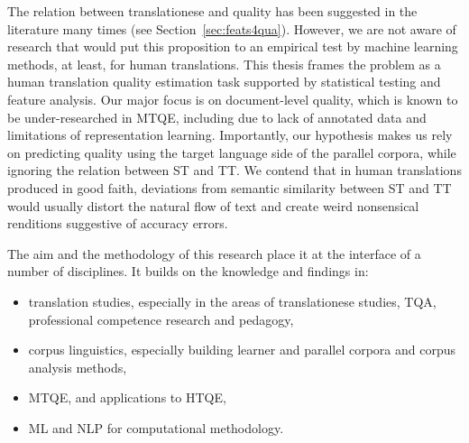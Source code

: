 The relation between translationese and quality has been suggested in the literature many times (see Section~\ref{sec:feats4qua}). However, we are not aware of research that would put this proposition to an empirical test by machine learning methods, at least, for human translations. This thesis frames the problem as a human translation quality estimation task supported by statistical testing and feature analysis. Our major focus is on document-level quality, which is known to be under-researched in MTQE, including due to lack of annotated data and limitations of representation learning. Importantly, our hypothesis makes us rely on predicting quality using the target language side of the parallel corpora, while ignoring the relation between ST and TT. We contend that in human translations produced in good faith, deviations from semantic similarity between ST and TT would usually distort the natural flow of text and create weird nonsensical renditions suggestive of accuracy errors. 

The aim and the methodology of this research place it at the interface of a number of disciplines. It builds on the knowledge and findings in: 
\begin{itemize}\compresslist{}
	\item translation studies, especially in the areas of translationese studies, \gls*{TQA}, professional competence research and pedagogy,
	\item corpus linguistics, especially building learner and parallel corpora and corpus analysis methods, 
	\item \gls*{MTQE}, and applications to HTQE,
	\item \gls*{ML} and \gls*{NLP} for computational methodology.
\end{itemize}

